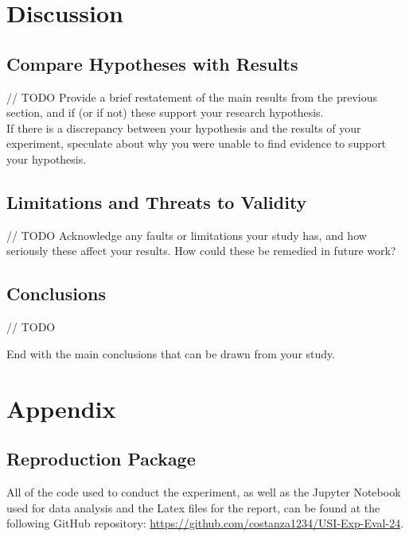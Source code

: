 \documentclass[unicode,11pt,a4paper,oneside,numbers=endperiod,openany]{scrartcl}
\begin{document}
\section{Discussion}

    \subsection{Compare Hypotheses with Results}

    // TODO
    Provide a brief restatement of the main results from the previous section, and if (or if not) these support your research hypothesis.\\

    If there is a discrepancy between your hypothesis and the results of your experiment, speculate about why you were unable to find evidence to support your hypothesis. 


    \subsection{Limitations and Threats to Validity}

    // TODO
    Acknowledge any faults or limitations your study has, and how seriously these affect your results. How could these be remedied in future work?


    \subsection{Conclusions}

    // TODO
    
    End with the main conclusions that can be drawn from your study.

\section{Appendix}

    \subsection{Reproduction Package}
    All of the code used to conduct the experiment, as well as the Jupyter Notebook used for data analysis and the Latex files for the report, can be found at the following GitHub repository: \url{https://github.com/costanza1234/USI-Exp-Eval-24}.
\end{document}
